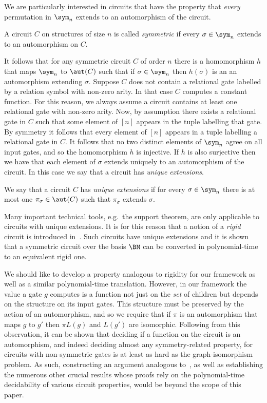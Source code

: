 \documentclass[a4paper,UKenglish]{lipics-v2018}
\begin{document}
We are particularly interested in circuits that have the property that
\emph{every} permutation in $\sym_n$ extends to an automorphism of the circuit.

\begin{definition}[Symmetry]
  A circuit $C$ on structures of size $n$ is called \emph{symmetric} if every
  $\sigma \in \sym_n$ extends to an automorphism on $C$.
\end{definition}

It follows that for any symmetric circuit $C$ of order $n$ there is a
homomorphism $h$ that maps $\sym_n$ to $\aut(C)$ such that if $\sigma \in
\sym_n$ then $h(\sigma)$ is an an automorphism extending $\sigma$. Suppose $C$
does not contain a relational gate labelled by a relation symbol with non-zero
arity. In that case $C$ computes a constant function. For this reason, we always
assume a circuit contains at least one relational gate with non-zero arity. Now,
by assumption there exists a relational gate in $C$ such that some element of
$[n]$ appears in the tuple labelling that gate. By symmetry it follows that
every element of $[n]$ appears in a tuple labelling a relational gate in $C$.
It follows that no two distinct elements of $\sym_n$ agree on all input gates,
and so the homomorphism $h$ is injective.
If $h$ is also surjective then we have that each element of
$\sigma$ extends uniquely to an automorphism of the circuit. In this case we say
that a circuit has \emph{unique extensions}.

\begin{definition}
  We say that a circuit $C$ has \emph{unique extensions} if for every $\sigma
  \in \sym_n$ there is at most one $\pi_{\sigma} \in \aut(C)$ such that
  $\pi_{\sigma}$ extends $\sigma$.
\end{definition}

Many important technical tools, e.g.\ the support theorem, are only applicable
to circuits with unique extensions.  It is for this reason that a
notion of a \emph{rigid} circuit is introduced in~\cite{AndersonD17}.
Such circuits have unique extensions and it is shown that a symmetric
circuit over the basis $\BM$ can be converted in polynomial-time to an
equivalent rigid one.

We should like to develop a property analogous to rigidity for our framework as
well as a similar polynomial-time translation. However, in our framework the
value a gate $g$ computes is a function not just on the \emph{set} of
children but depends on the structure on its input gates.  This structure must be preserved by the action of an automorphism, and so
we require that if $\pi$ is an automorphism that maps $g$ to $g'$ then $\pi
L(g)$ and $L(g')$ are isomorphic. Following from this observation, it can be
shown that deciding if a function on the circuit is an automorphism, and indeed
deciding almost any symmetry-related property, for circuits with non-symmetric
gates is at least as hard as the graph-isomorphism problem. As such,
constructing an argument analogous to~\cite{AndersonD17}, as well as
establishing the numerous other crucial results whose proofs rely on the
polynomial-time decidability of various circuit properties, would be beyond the
scope of this paper.
\end{document}

